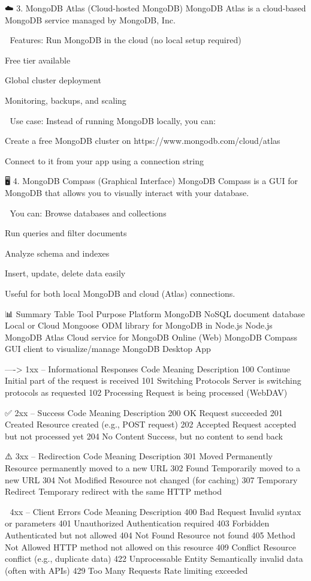 ☁️ 3. MongoDB Atlas (Cloud-hosted MongoDB)
MongoDB Atlas is a cloud-based MongoDB service managed by MongoDB, Inc.

🔑 Features:
Run MongoDB in the cloud (no local setup required)

Free tier available

Global cluster deployment

Monitoring, backups, and scaling

🧾 Use case:
Instead of running MongoDB locally, you can:

Create a free MongoDB cluster on https://www.mongodb.com/cloud/atlas

Connect to it from your app using a connection string

🖥️ 4. MongoDB Compass (Graphical Interface)
MongoDB Compass is a GUI for MongoDB that allows you to visually interact with your database.

🧰 You can:
Browse databases and collections

Run queries and filter documents

Analyze schema and indexes

Insert, update, delete data easily

Useful for both local MongoDB and cloud (Atlas) connections.

📊 Summary Table
Tool	Purpose	Platform
MongoDB	NoSQL document database	Local or Cloud
Mongoose	ODM library for MongoDB in Node.js	Node.js
MongoDB Atlas	Cloud service for MongoDB	Online (Web)
MongoDB Compass	GUI client to visualize/manage MongoDB	Desktop App

---->
1xx – Informational Responses
Code	Meaning	Description
100	Continue	Initial part of the request is received
101	Switching Protocols	Server is switching protocols as requested
102	Processing	Request is being processed (WebDAV)

✅ 2xx – Success
Code	Meaning	Description
200	OK	Request succeeded
201	Created	Resource created (e.g., POST request)
202	Accepted	Request accepted but not processed yet
204	No Content	Success, but no content to send back

⚠️ 3xx – Redirection
Code	Meaning	Description
301	Moved Permanently	Resource permanently moved to a new URL
302	Found	Temporarily moved to a new URL
304	Not Modified	Resource not changed (for caching)
307	Temporary Redirect	Temporary redirect with the same HTTP method

🚫 4xx – Client Errors
Code	Meaning	Description
400	Bad Request	Invalid syntax or parameters
401	Unauthorized	Authentication required
403	Forbidden	Authenticated but not allowed
404	Not Found	Resource not found
405	Method Not Allowed	HTTP method not allowed on this resource
409	Conflict	Resource conflict (e.g., duplicate data)
422	Unprocessable Entity	Semantically invalid data (often with APIs)
429	Too Many Requests	Rate limiting exceeded

